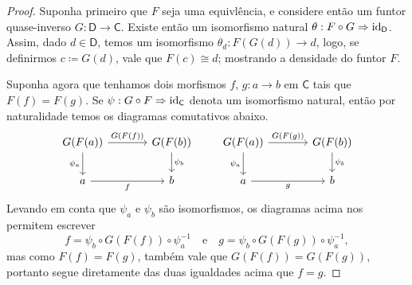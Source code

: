 \begin{proof}
  Suponha primeiro que $F$ seja uma equivlência, e considere então um funtor quase-inverso $G: \mathsf{D} \to \mathsf{C}$.
  Existe então um isomorfismo natural $\theta: F \circ G \Rightarrow \mathrm{id}_{\mathsf{D}}$.
  Assim, dado $d \in \mathsf{D}$, temos um isomorfismo $\theta_{d}: F(G(d)) \to d$, logo, se definirmos $c \coloneqq G(d)$, vale que $F(c) \cong d$; mostrando a densidade do funtor $F$.

  Suponha agora que tenhamos dois morfismos $f,\, g: a \to b$ em $\mathsf{C}$ tais que $F(f) = F(g)$.
  Se $\psi: G \circ F \Rightarrow \mathrm{id}_{\mathsf{C}}$ denota um isomorfismo natural, então por naturalidade temos os diagramas comutativos abaixo.
  \begin{displaymath}
    \begin{tikzcd}[column sep=1.25cm]
      G(F(a))
      \arrow[r, "G(F(f))"]
      \arrow[d, "\psi_{a}" swap]
      & G(F(b))
      \arrow[d, "\psi_{b}"]
      \\ a
      \arrow[r, "f" swap]
      & b
    \end{tikzcd}
    \qquad
    \begin{tikzcd}[column sep=1.25cm]
      G(F(a))
      \arrow[r, "G(F(g))"]
      \arrow[d, "\psi_{a}" swap]
      & G(F(b))
      \arrow[d, "\psi_{b}"]
      \\ a
      \arrow[r, "g" swap]
      & b
    \end{tikzcd}
  \end{displaymath}
  Levando em conta que $\psi_{a}$ e $\psi_{b}$ são isomorfismos, os diagramas acima nos permitem escrever
  \begin{displaymath}
    f = \psi_{b} \circ G(F(f)) \circ \psi_{a}^{-1} \quad \text{e} \quad g = \psi_{b} \circ G(F(g)) \circ \psi_{a}^{-1},
  \end{displaymath}
  mas como $F(f) = F(g)$, também vale que $G(F(f)) = G(F(g))$, portanto segue diretamente das duas igualdades acima que $f = g$.


\end{proof}
